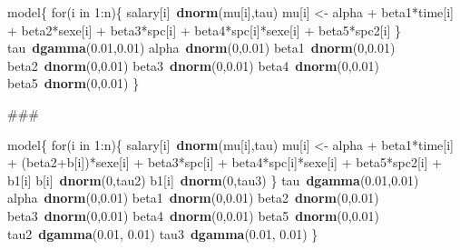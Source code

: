 \documentclass[]{article}
\newenvironment{Shaded}{\begin{snugshade}}{\end{snugshade}}
\newcommand{\KeywordTok}[1]{\textcolor[rgb]{0.13,0.29,0.53}{\textbf{{#1}}}}
\newcommand{\DecValTok}[1]{\textcolor[rgb]{0.00,0.00,0.81}{{#1}}}
\newcommand{\FloatTok}[1]{\textcolor[rgb]{0.00,0.00,0.81}{{#1}}}
\newcommand{\StringTok}[1]{\textcolor[rgb]{0.31,0.60,0.02}{{#1}}}
\newcommand{\NormalTok}[1]{{#1}}
\begin{document}
\begin{Shaded}
\begin{Highlighting}[]
\NormalTok{model\{}
\NormalTok{for(i in }\DecValTok{1}\NormalTok{:n)\{}
\NormalTok{salary[i]~}\KeywordTok{dnorm}\NormalTok{(mu[i],tau)}
\NormalTok{mu[i] <-}\StringTok{ }\NormalTok{alpha +}\StringTok{ }\NormalTok{beta1*time[i] +}\StringTok{ }\NormalTok{beta2*sexe[i] +}\StringTok{ }\NormalTok{beta3*spc[i] +}\StringTok{ }\NormalTok{beta4*spc[i]*sexe[i] +}\StringTok{ }
\NormalTok{beta5*spc2[i]}
\NormalTok{\}}
\NormalTok{tau~}\KeywordTok{dgamma}\NormalTok{(}\FloatTok{0.01}\NormalTok{,}\FloatTok{0.01}\NormalTok{)}
\NormalTok{alpha~}\KeywordTok{dnorm}\NormalTok{(}\DecValTok{0}\NormalTok{,}\FloatTok{0.01}\NormalTok{)}
\NormalTok{beta1~}\KeywordTok{dnorm}\NormalTok{(}\DecValTok{0}\NormalTok{,}\FloatTok{0.01}\NormalTok{)}
\NormalTok{beta2~}\KeywordTok{dnorm}\NormalTok{(}\DecValTok{0}\NormalTok{,}\FloatTok{0.01}\NormalTok{)}
\NormalTok{beta3~}\KeywordTok{dnorm}\NormalTok{(}\DecValTok{0}\NormalTok{,}\FloatTok{0.01}\NormalTok{)}
\NormalTok{beta4~}\KeywordTok{dnorm}\NormalTok{(}\DecValTok{0}\NormalTok{,}\FloatTok{0.01}\NormalTok{)}
\NormalTok{beta5~}\KeywordTok{dnorm}\NormalTok{(}\DecValTok{0}\NormalTok{,}\FloatTok{0.01}\NormalTok{)}
\NormalTok{\}}

\NormalTok{###}

\NormalTok{model\{}
\NormalTok{for(i in }\DecValTok{1}\NormalTok{:n)\{}
\NormalTok{salary[i]~}\KeywordTok{dnorm}\NormalTok{(mu[i],tau)}
\NormalTok{mu[i] <-}\StringTok{ }\NormalTok{alpha +}\StringTok{ }\NormalTok{beta1*time[i] +}\StringTok{ }\NormalTok{(beta2+b[i])*sexe[i] +}\StringTok{ }\NormalTok{beta3*spc[i] +}\StringTok{ }\NormalTok{beta4*spc[i]*sexe[i] +}
\NormalTok{beta5*spc2[i] +}\StringTok{ }\NormalTok{b1[i]}
\NormalTok{b[i]~}\KeywordTok{dnorm}\NormalTok{(}\DecValTok{0}\NormalTok{,tau2)}
\NormalTok{b1[i]~}\KeywordTok{dnorm}\NormalTok{(}\DecValTok{0}\NormalTok{,tau3)}
\NormalTok{\}}
\NormalTok{tau~}\KeywordTok{dgamma}\NormalTok{(}\FloatTok{0.01}\NormalTok{,}\FloatTok{0.01}\NormalTok{)}
\NormalTok{alpha~}\KeywordTok{dnorm}\NormalTok{(}\DecValTok{0}\NormalTok{,}\FloatTok{0.01}\NormalTok{)}
\NormalTok{beta1~}\KeywordTok{dnorm}\NormalTok{(}\DecValTok{0}\NormalTok{,}\FloatTok{0.01}\NormalTok{)}
\NormalTok{beta2~}\KeywordTok{dnorm}\NormalTok{(}\DecValTok{0}\NormalTok{,}\FloatTok{0.01}\NormalTok{)}
\NormalTok{beta3~}\KeywordTok{dnorm}\NormalTok{(}\DecValTok{0}\NormalTok{,}\FloatTok{0.01}\NormalTok{)}
\NormalTok{beta4~}\KeywordTok{dnorm}\NormalTok{(}\DecValTok{0}\NormalTok{,}\FloatTok{0.01}\NormalTok{)}
\NormalTok{beta5~}\KeywordTok{dnorm}\NormalTok{(}\DecValTok{0}\NormalTok{,}\FloatTok{0.01}\NormalTok{)}
\NormalTok{tau2~}\KeywordTok{dgamma}\NormalTok{(}\FloatTok{0.01}\NormalTok{, }\FloatTok{0.01}\NormalTok{)}
\NormalTok{tau3~}\KeywordTok{dgamma}\NormalTok{(}\FloatTok{0.01}\NormalTok{, }\FloatTok{0.01}\NormalTok{)}
\NormalTok{\}}
\end{Highlighting}
\end{Shaded}
\end{document}
